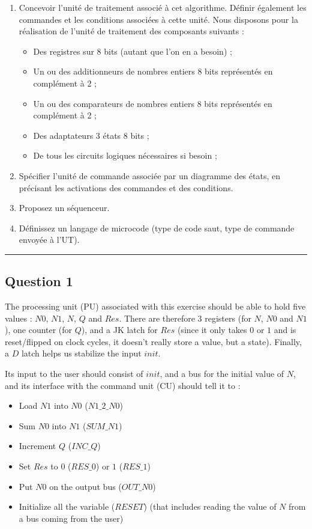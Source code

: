 \documentclass[a4paper,10pt]{article}
\def\centralruler{\begin{center}\rule{5cm}{.1pt}\end{center}}
\begin{document}
\begin{enumerate}
	\item Concevoir l'unité de traitement associé à cet algorithme. Définir également les commandes et les conditions associées à cette unité. Nous disposons pour la réalisation de l'unité de traitement des composants suivants :
		\begin{itemize}
			\item Des registres sur 8 bits (autant que l'on en a besoin) ;
			\item Un ou des additionneurs de nombres entiers 8 bits représentés en complément à 2 ;
			\item Un ou des comparateurs de nombres entiers 8 bits représentés en complément à 2 ;
			\item Des adaptateurs 3 états 8 bits ;
			\item De tous les circuits logiques nécessaires si besoin ;
		\end{itemize}
	\item Spécifier l'unité de commande associée par un diagramme des états, en précisant les activations des commandes et des conditions.
	\item Proposez un séquenceur.
	\item Définissez un langage de microcode (type de code saut, type de commande envoyée à l'UT).
\end{enumerate}
\centralruler{}

\subsection{Question 1}

The processing unit (PU) associated with this exercise should be able to hold five values : $N0$, $N1$, $N$, $Q$ and $Res$. There are therefore 3 registers (for $N$, $N0$ and $N1$), one counter (for $Q$), and a JK latch for $Res$ (since it only takes $0$ or $1$ and is reset/flipped on clock cycles, it doesn't really store a value, but a state). Finally, a $D$ latch helps us stabilize the input $init$.

Its input to the user should consist of $init$, and a bus for the initial value of $N$, and its interface with the command unit (CU) should tell it to :
\begin{itemize}
	\item Load $N1$ into $N0$ ($N1\_2\_N0$)
	\item Sum $N0$ into $N1$ ($SUM\_N1$)
	\item Increment $Q$ ($INC\_Q$)
	\item Set $Res$ to $0$ ($RES\_0$) or $1$ ($RES\_1$)
	\item Put $N0$ on the output bus ($OUT\_N0$)
	\item Initialize all the variable ($RESET$) (that includes reading the value of $N$ from a bus coming from the user)
\end{itemize}
\end{document}
